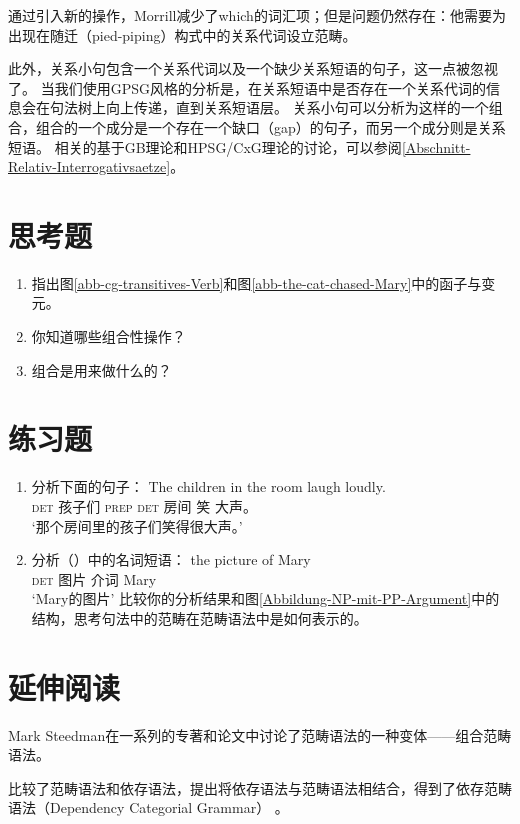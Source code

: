 通过引入新的操作，Morrill减少了which的词汇项；但是问题仍然存在：他需要为出现在随迁（pied-piping）构式中的关系代词设立范畴。

此外，关系小句包含一个关系代词以及一个缺少关系短语的句子，这一点被忽视了。
当我们使用GPSG风格\indexgpsgc 的分析是，在关系短语中是否存在一个关系代词的信息会在句法树上向上传递，直到关系短语层。
关系小句可以分析为这样的一个组合，组合的一个成分是一个存在一个缺口（gap）的句子，而另一个成分则是关系短语。
相关的基于GB理论和HPSG/CxG理论的讨论，可以参阅\ref{Abschnitt-Relativ-Interrogativsaetze}。 

\section*{思考题}

\begin{enumerate}
\item 指出图\ref{abb-cg-transitives-Verb}和图\ref{abb-the-cat-chased-Mary}中的函子与变元。
\item 你知道哪些组合性操作？
\item 组合是用来做什么的？
\end{enumerate}
\pagebreak

\section*{练习题}

\begin{enumerate}
\item 分析下面的句子：
\ea
\gll The children in the room laugh loudly. \\
     \textsc{det} 孩子们 \textsc{prep} \textsc{det} 房间 笑 大声。\\
\glt `那个房间里的孩子们笑得很大声。'
\z
\item\label{ue-Xbar-CG} 分析（）中的名词短语：
\ea
\gll the picture of Mary \\
     \textsc{det} 图片 介词 Mary \\
\glt `Mary的图片'
\z
比较你的分析结果和图\vref{Abbildung-NP-mit-PP-Argument}中的结构，思考\xbarc 句法中的范畴在范畴语法中是如何表示的。
\end{enumerate}

\section*{延伸阅读}

\begin{sloppypar}
Mark Steedman在一系列的专著和论文中讨论了范畴语法的一种变体——组合范畴语法\citet{Steedman91a,Steedman2000a-u,SB2006a-u}。
\end{sloppypar}
\citet{Lobin2003a}比较了范畴语法和依存语法，\citet{PB93a}提出将依存语法与范畴语法相结合，得到了依存范畴语法（Dependency Categorial Grammar）
。 

